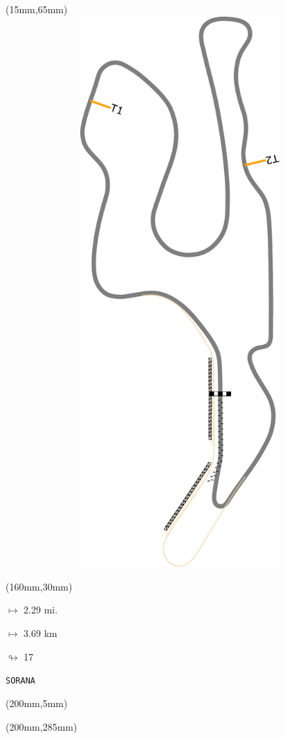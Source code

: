 \begin{textblock*}{185mm}(15mm,65mm)%
\centering
\mbox{\includegraphics[width=185mm,height=210mm,keepaspectratio]{PT/SORANA.pdf}}
\end{textblock*}
\begin{textblock*}{40mm}(160mm,30mm)%
\Large
\par$\mapsto$ 2.29 mi.
\par$\mapsto$ 3.69 km
\par$\looparrowright$ 17
\par\hfill\tiny\tt SORANA\\
\end{textblock*}
\begin{textblock*}{20mm}(200mm,5mm)%
\fbox{\thepage}
\label{SORANA}
\end{textblock*}
\begin{textblock*}{20mm}(200mm,285mm)%
\fbox{\thepage}
\end{textblock*}

